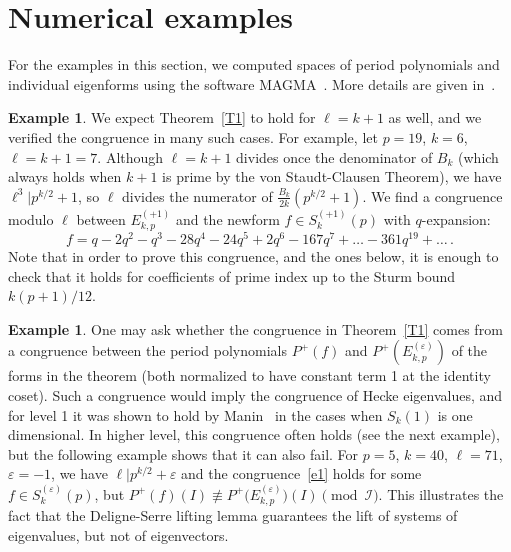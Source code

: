 \documentclass{amsart}
\theoremstyle{plain}
\theoremstyle{definition}
\newtheorem{example}[theorem]{Example}
\numberwithin{equation}{section}
\newcommand{\comment}[1]{}
\def\I{\mathcal{I}} \def\J{\mathcal{J}} \def\LL{\mathcal{L}}
\def\e{\varepsilon} \def\DD{\Delta} \def\G{\Gamma}\def\om{\omega}
\begin{document}
\section{Numerical examples}\label{S5}

For the examples in this section, we computed spaces of period polynomials
and individual eigenforms using the software MAGMA~\cite{MGM}. More details 
are given in~\cite[Sec. 5.5]{PP}.
 

\begin{example} \label{ex1} We expect Theorem~\ref{T1} to hold for $\ell=k+1$ as well,
and we verified the congruence in many such cases. For example, let 
 $p=19$, $k=6$, $\ell=k+1=7$. Although $\ell=k+1$ divides once the denominator of 
$B_k$ (which always holds when $k+1$ is prime by the von Staudt-Clausen Theorem),
we have $\ell^3|p^{k/2}+1$, so $\ell$ divides the numerator of 
$\frac{B_k}{2k}(p^{k/2}+1)$. We find a congruence modulo $\ell$ between 
$E_{k,p}^{(+1)}$ and the newform $f\in S_k^{(+1)}(p)$ with $q$-expansion:
\[f=q-2q^2-q^3-28 q^4-24q^5+2q^6-167q^7+\ldots-361 q^{19}+\ldots\,.
\]
Note that in order to prove this congruence, and the ones below, it is enough to check that it holds 
for coefficients of prime index up to the Sturm bound $k(p+1)/12$.
\end{example}
\comment{
\begin{example} Let $p=47$, $k=24$, $\ell=103$. We have 
$\ell|p^{k/2}-1$, but also $\ell| \frac{B_k}{2k}$, so this case is not covered 
by~\cite{DF}. Theorem~\ref{T1} gives a congruence between $E_{k,p}^{(-1)}$ and 
a newform $f\in S_k^{(-1)}(p)$. 
The newforms in $S_k^{(-1)}(p)$ are Galois conjugate over a field
of degree 41, and we verified the congruence by showing that the norms of the 
difference between Fourier coefficients are divisible by $\ell$. We also checked 
that the 
subspace of $W_{k-2}^+(p)^{\new}_{/ \FF_\ell}$ on which the Atkin-Lehner involution
acts as $-1$ has expected dimension 41, confirming the surjectivity in 
Theorem~\ref{T2}. 
\end{example}
}
\begin{example}\label{ex2}
One may ask whether the congruence in Theorem~\ref{T1}
comes from a congruence between the period polynomials 
$P^+(f)$ and $P^+(E_{k,p}^{(\e)})$ of the forms in the theorem (both normalized to
have constant term 1 at the identity coset). Such a congruence would imply the 
congruence of Hecke eigenvalues, and for level 1 it was shown to hold by 
Manin~\cite{Ma} in the cases when $S_k(1)$ is one dimensional. 
In higher level, this congruence often holds (see the next example), 
but the following example shows that it can also fail. For $p=5$, $k=40$, 
$\ell=71$, $\e=-1$, we have 
$\ell|p^{k/2}+\e$ and the congruence~\eqref{e1} holds for some $f\in S_k^{(\e)}(p)$, 
but $P^+(f)(I)\not\equiv P^+\big(E_{k,p}^{(\e)}\big)(I) \pmod \I$. This 
illustrates the fact that the Deligne-Serre lifting lemma guarantees the 
lift of systems of eigenvalues, but not of eigenvectors. 
\end{example}
\end{document}
